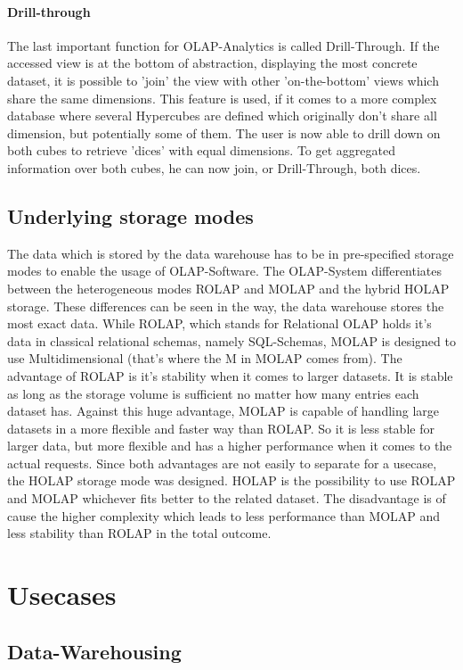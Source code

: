 \documentclass[12pt,a4paper,oneside,
liststotoc, 					%
bibtotoc,						%
titlepage, 						%
headsepline, 					%
BCOR6mm,						%
openany,							%
]{scrreprt}
\begin{document}
\subsubsection{Drill-through}\label{drill}
The last important function for OLAP-Analytics is called Drill-Through. If the accessed view is at the bottom of abstraction, displaying the most concrete dataset, it is possible to 'join' the view with other 'on-the-bottom' views which share the same dimensions. This feature is used, if it comes to a more complex database where several Hypercubes are defined which originally don't share all dimension, but potentially some of them. The user is now able to drill down on both cubes to retrieve 'dices' with equal dimensions. To get aggregated information over both cubes, he can now join, or Drill-Through, both dices.
\section{Underlying storage modes}
The data which is stored by the data warehouse has to be in pre-specified storage modes to enable the usage of OLAP-Software. The OLAP-System differentiates between the heterogeneous modes ROLAP and MOLAP and the hybrid HOLAP storage. These differences can be seen in the way, the data warehouse stores the most exact data. While ROLAP, which stands for Relational OLAP holds it's data in classical relational schemas, namely SQL-Schemas, MOLAP is designed to use Multidimensional (that's where the M in MOLAP comes from). The advantage of ROLAP is it's stability when it comes to larger datasets. It is stable as long as the storage volume is sufficient no matter how many entries each dataset has. Against this huge advantage, MOLAP is capable of handling large datasets in a more flexible and faster way than ROLAP. So it is less stable for larger data, but more flexible and has a higher performance when it comes to the actual requests.
Since both advantages are not easily to separate for a usecase, the HOLAP storage mode was designed. HOLAP is the possibility to use ROLAP and MOLAP whichever fits better to the related dataset. The disadvantage is of cause the higher complexity which leads to less performance than MOLAP and less stability than ROLAP in the total outcome.
\chapter{Usecases}\label{usecases}
\section{Data-Warehousing}\label{ucdw}
\end{document}
